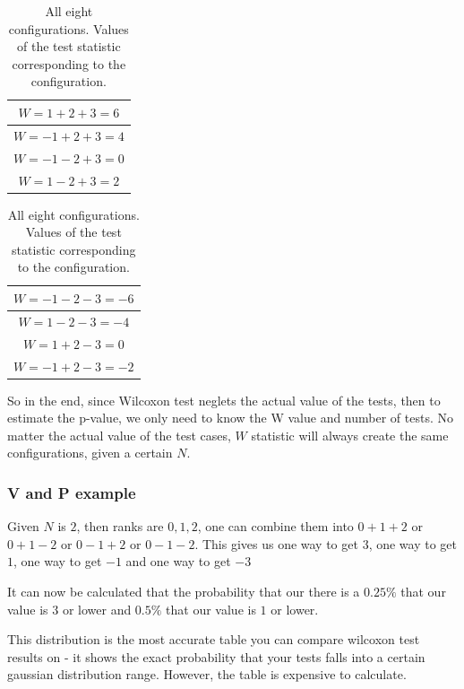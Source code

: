 \documentclass[12pt]{article}
\begin{document}
\begin{table}[H]
  \begin{center}
      \begin{tabular}{c}
      \hline
      $W = 1 + 2 + 3 = 6$ \\
      \hline
      $W = -1 + 2 + 3 = 4$\\
      \hline
      $W = -1 - 2 + 3 = 0$\\
      \hline
      $W = 1 - 2 + 3 = 2$\\
      \hline
      \end{tabular}
      \begin{tabular}{c}
      \hline
      $W = -1 - 2 - 3 = -6$\\
      \hline
      $W = 1 - 2 - 3 = -4$\\
      \hline
      $W = 1 + 2 - 3 = 0$\\
      \hline
      $W = -1 + 2 - 3 = -2$\\
      \hline
      \end{tabular}
    \caption{All eight configurations. Values of the test statistic corresponding to the configuration.}
    \label{table:adding_w_results}
  \end{center}
\end{table}

So in the end, since Wilcoxon test neglets the actual value of the tests, then to estimate the p-value, we only need to know the W value and number of tests. No matter the actual value of the test cases, $W$ statistic will always create the same configurations, given a certain $N$.

\subsubsection{V and P example}

Given $N$ is $2$, then ranks are ${0, 1, 2}$, one can combine them into $0 + 1 + 2$ or $0 + 1 - 2$ or $0 - 1 + 2$ or $0 - 1 - 2$. This gives us one way to get $3$, one way to get $1$, one way to get $-1$ and one way to get $-3$

It can now be calculated that the probability that our there is a $0.25\%$ that our value is $3$ or lower and $0.5\%$ that our value is $1$ or lower.

This distribution is the most accurate table you can compare wilcoxon test results on - it shows the exact probability that your tests falls into a certain gaussian distribution range. However, the table is expensive to calculate.
\end{document}

